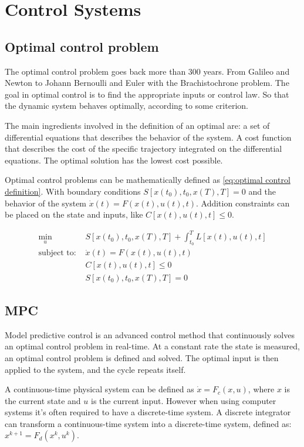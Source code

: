 \chapter{Control Systems}
\section{Optimal control problem}
	The optimal control problem goes back more than 300 years. From Galileo and Newton to Johann Bernoulli and Euler with the Brachistochrone problem. The goal in optimal control is to find the appropriate inputs or control law. So that the dynamic system behaves optimally, according to some criterion. 
	
	The main ingredients involved in the definition of an optimal are: a set of differential equations that describes the behavior of the system. A cost function that describes the cost of the specific trajectory integrated on the differential equations. The optimal solution has the lowest cost possible.
	
	Optimal control problems can be mathematically defined as \eqref{eq:optimal control definition}. With boundary conditions $S[x(t_0),t_0,x(T),T]=0$ and the behavior of the system $ \dot{x}(t) = F(x(t),u(t),t)$. Addition constraints can be placed on the state and inputs, like $C[x(t),u(t),t]\le 0$. 
	
	\begin{equation}
		\begin{aligned}
			\min_u \ & S[x(t_0),t_0,x(T),T] + \int_{t_0}^{T} L[x(t),u(t),t] \\ 
			\text{subject to: } & \dot{x}(t) = F(x(t),u(t),t) \\
			& C[x(t),u(t),t]\le 0 \\
			& S[x(t_0),t_0,x(T),T]=0
		\end{aligned}
		\label{eq:optimal control definition}
	\end{equation}

\section{MPC}
	Model predictive control is an advanced control method that continuously solves an  optimal control problem in real-time. At a constant rate the state is measured, an optimal control problem is defined and solved. The  optimal input is then applied to the system, and the cycle repeats itself.
	
	A continuous-time physical system can be defined as $\dot{x}=F_c(x,u)$, where $x$ is the current state and $u$ is the current input. However when using computer systems it's often required to have a discrete-time system. A discrete integrator can transform a continuous-time system into a discrete-time system, defined as: $x^{k+1}=F_d(x^{k},u^{k})$. 
	
